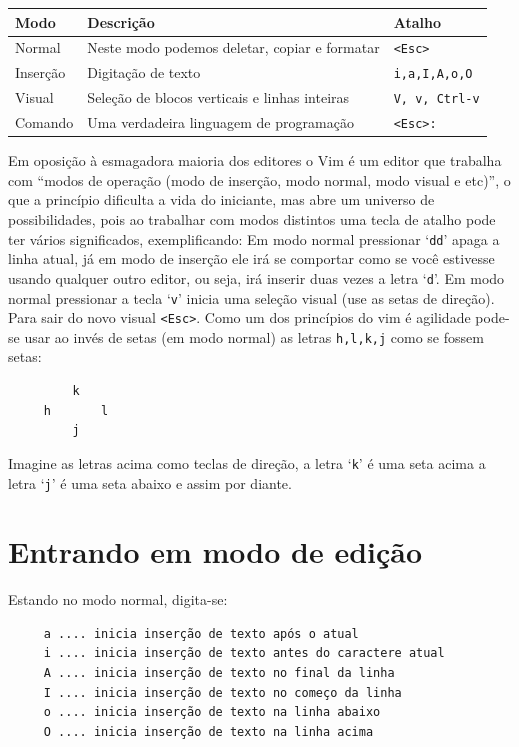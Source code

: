\begin{tabular}{|l|l|l|}
\hline
\textbf{Modo} & \textbf{Descrição} & \textbf{Atalho} \tabularnewline
\hline \hline
Normal\index{modo normal} & Neste modo podemos deletar, copiar e formatar & {\tt <Esc>}\tabularnewline
\hline
Inserção\index{modo de inserção} & Digitação de texto & {}{\tt i,a,I,A,o,O}\tabularnewline
\hline
Visual\index{modo visual} & Seleção de blocos verticais e linhas inteiras & {}{\tt V, v, Ctrl-v} \tabularnewline
\hline
Comando\index{modo de comando} & Uma verdadeira linguagem de programação & {}{\tt <Esc>:}\tabularnewline
\hline
\end{tabular}


Em oposição à esmagadora maioria dos editores o Vim é um editor que trabalha
com ``modos de operação (modo de inserção, modo normal, modo visual e etc)'', o
que a princípio dificulta a vida do iniciante, mas abre um universo de
possibilidades, pois ao trabalhar com modos distintos uma tecla de atalho pode
ter vários significados, exemplificando: Em
modo normal pressionar `{\tt dd}' apaga a linha atual, já em modo de inserção
ele irá se comportar como se você estivesse usando qualquer outro editor, ou
seja, irá inserir duas vezes a letra `{\tt d}'.  Em modo normal pressionar a
tecla `{\tt v}' inicia uma seleção visual (use as setas de direção).  Para sair
do novo visual \verb|<Esc>|.  Como um dos princípios do vim é agilidade pode-se
usar ao invés de setas (em modo normal) as letras {\tt h,l,k,j} como se fossem
setas:

\begin{verbatim}
         k
     h       l
         j
\end{verbatim}

Imagine as letras acima como teclas de direção, a letra `{\tt k}' é uma seta acima
a letra `{\tt j}' é uma seta abaixo e assim por diante.

\section{Entrando em modo de edição}\label{Entrando em modo de edição}
Estando no modo normal, digita-se:
\begin{verbatim}
     a .... inicia inserção de texto após o atual
     i .... inicia inserção de texto antes do caractere atual
     A .... inicia inserção de texto no final da linha
     I .... inicia inserção de texto no começo da linha
     o .... inicia inserção de texto na linha abaixo
     O .... inicia inserção de texto na linha acima
\end{verbatim}

